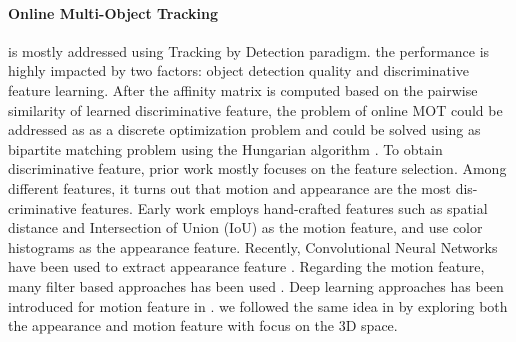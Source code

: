 \documentclass[10pt,twocolumn,letterpaper]{article}
\begin{document}
\paragraph{Online Multi-Object Tracking} is mostly addressed using Tracking by Detection paradigm. the performance is highly impacted by two factors: object detection quality and discriminative feature learning. After the affinity matrix is computed based on the pairwise similarity of learned discriminative feature, the problem of online MOT could be addressed as as a discrete optimization problem and could be solved using as  bipartite matching problem using the Hungarian algorithm \cite{kuhn1955hungarian}. To obtain discriminative feature, prior work mostly focuses on the feature selection. Among different features, it turns out that motion and appearance are the most dis- criminative features. Early work employs hand-crafted features such as spatial distance \cite{pirsiavash2011globally} and Intersection of Union (IoU) \cite{bochinski2017high} as the motion feature, and use color histograms as the appearance feature. Recently, Convolutional Neural Networks have been used to extract appearance feature \cite{baser2019fantrack, frossard2018end}. Regarding the motion feature, many filter based approaches has been used \cite{bewley2016simple, weng2019baseline}. Deep learning approaches has been introduced for motion feature in \cite{baser2019fantrack}. we followed the same idea in \cite{wojke2017simple, weng2020gnn3dmot} by exploring both the appearance and motion feature with focus on the 3D space.
\end{document}
